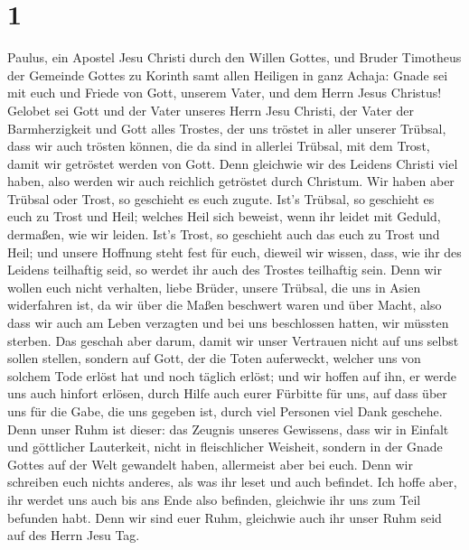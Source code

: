 \hypertarget{section}{%
\section{1}\label{section}}

 Paulus, ein Apostel Jesu Christi durch den Willen Gottes,
und Bruder Timotheus der Gemeinde Gottes zu Korinth samt allen Heiligen
in ganz Achaja:  Gnade sei mit euch und Friede von Gott,
unserem Vater, und dem Herrn Jesus Christus!  Gelobet sei
Gott und der Vater unseres Herrn Jesu Christi, der Vater der
Barmherzigkeit und Gott alles Trostes,  der uns tröstet in
aller unserer Trübsal, dass wir auch trösten können, die da sind in
allerlei Trübsal, mit dem Trost, damit wir getröstet werden von Gott.
 Denn gleichwie wir des Leidens Christi viel haben, also
werden wir auch reichlich getröstet durch Christum.  Wir
haben aber Trübsal oder Trost, so geschieht es euch zugute. Ist's
Trübsal, so geschieht es euch zu Trost und Heil; welches Heil sich
beweist, wenn ihr leidet mit Geduld, dermaßen, wie wir leiden. Ist's
Trost, so geschieht auch das euch zu Trost und Heil;  und
unsere Hoffnung steht fest für euch, dieweil wir wissen, dass, wie ihr
des Leidens teilhaftig seid, so werdet ihr auch des Trostes teilhaftig
sein.  Denn wir wollen euch nicht verhalten, liebe Brüder,
unsere Trübsal, die uns in Asien widerfahren ist, da wir über die Maßen
beschwert waren und über Macht, also dass wir auch am Leben verzagten
 und bei uns beschlossen hatten, wir müssten sterben. Das
geschah aber darum, damit wir unser Vertrauen nicht auf uns selbst
sollen stellen, sondern auf Gott, der die Toten auferweckt,
 welcher uns von solchem Tode erlöst hat und noch täglich
erlöst; und wir hoffen auf ihn, er werde uns auch hinfort erlösen,
 durch Hilfe auch eurer Fürbitte für uns, auf dass über
uns für die Gabe, die uns gegeben ist, durch viel Personen viel Dank
geschehe.  Denn unser Ruhm ist dieser: das Zeugnis
unseres Gewissens, dass wir in Einfalt und göttlicher Lauterkeit, nicht
in fleischlicher Weisheit, sondern in der Gnade Gottes auf der Welt
gewandelt haben, allermeist aber bei euch.  Denn wir
schreiben euch nichts anderes, als was ihr leset und auch befindet. Ich
hoffe aber, ihr werdet uns auch bis ans Ende also befinden, gleichwie
ihr uns zum Teil befunden habt.  Denn wir sind euer Ruhm,
gleichwie auch ihr unser Ruhm seid auf des Herrn Jesu Tag.
